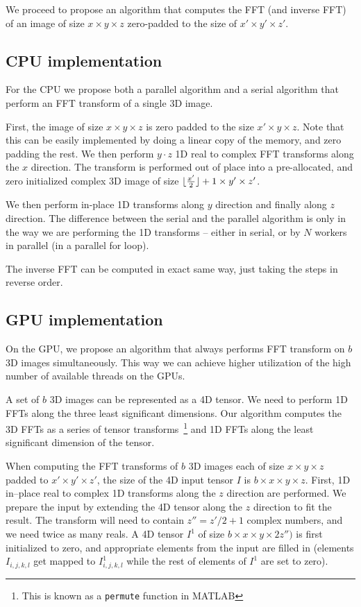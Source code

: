 \documentclass[conference]{IEEEtran}
\DeclarePairedDelimiter{\floor}{\lfloor}{\rfloor}
\begin{document}
  We proceed to propose an algorithm that computes the FFT (and
  inverse FFT) of an image of size $x \times y \times z$ zero-padded
  to the size of $x' \times y' \times z'$.

\subsection{CPU implementation}

  For the CPU we propose both a parallel algorithm and a serial
  algorithm that perform an FFT transform of a single 3D image.

  First, the image of size $x \times y \times z$ is zero padded to the
  size $x' \times y \times z$.  Note that this can be easily
  implemented by doing a linear copy of the memory, and zero padding
  the rest. We then perform $y \cdot z$ 1D real to complex FFT
  transforms along the $x$ direction.  The transform is performed out
  of place into a pre-allocated, and zero initialized complex 3D image
  of size $\floor{\frac{x'}{2}} + 1 \times y' \times z'$.

  We then perform in-place 1D transforms along $y$ direction and
  finally along $z$ direction.  The difference between the serial and
  the parallel algorithm is only in the way we are performing the 1D
  transforms -- either in serial, or by $N$ workers in parallel (in a
  parallel for loop).

  The inverse FFT can be computed in exact same way, just taking the
  steps in reverse order.

\subsection{GPU implementation}

\label{sec:gpu-fft-impl}

  On the GPU, we propose an algorithm that always performs FFT
  transform on $b$ 3D images simultaneously.  This way we can achieve
  higher utilization of the high number of available threads on the
  GPUs.

  A set of $b$ 3D images can be represented as a 4D tensor.  We need
  to perform 1D FFTs along the three least significant dimensions.
  Our algorithm computes the 3D FFTs as a series of tensor
  transforms~\footnote{This is known as a \texttt{permute} function in
    MATLAB} and 1D FFTs along the least significant dimension of the
  tensor.

  When computing the FFT transforms of $b$ 3D images each of size $x
  \times y \times z$ padded to $x' \times y' \times z'$, the size of
  the 4D input tensor $I$ is $b \times x \times y \times z$.  First,
  1D in--place real to complex 1D transforms along the $z$ direction
  are performed. We prepare the input by extending the 4D tensor along
  the $z$ direction to fit the result.  The transform will need to
  contain $z'' = z' / 2 + 1$ complex numbers, and we need twice as
  many reals.  A 4D tensor $I^1$ of size $b \times x \times y \times
  2z'')$ is first initialized to zero, and appropriate elements from
  the input are filled in (elements $I_{i,j,k,l}$ get mapped to
  $I^1_{i,j,k,l}$ while the rest of elements of $I^1$ are set to
  zero).
\end{document}
